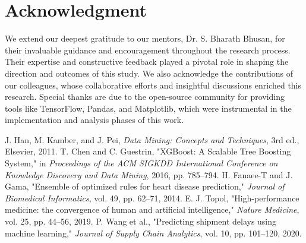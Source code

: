 \documentclass[conference]{IEEEtran}
\begin{document}
\section*{Acknowledgment}
We extend our deepest gratitude to our mentors, Dr. S. Bharath Bhusan, for their invaluable guidance and encouragement throughout the research process. Their expertise and constructive feedback played a pivotal role in shaping the direction and outcomes of this study. We also acknowledge the contributions of our colleagues, whose collaborative efforts and insightful discussions enriched this research. Special thanks are due to the open-source community for providing tools like TensorFlow, Pandas, and Matplotlib, which were instrumental in the implementation and analysis phases of this work.

\begin{thebibliography}{00}
 J. Han, M. Kamber, and J. Pei, \textit{Data Mining: Concepts and Techniques}, 3rd ed., Elsevier, 2011.
 T. Chen and C. Guestrin, "XGBoost: A Scalable Tree Boosting System," in \textit{Proceedings of the ACM SIGKDD International Conference on Knowledge Discovery and Data Mining}, 2016, pp. 785--794.
 H. Fanaee-T and J. Gama, "Ensemble of optimized rules for heart disease prediction," \textit{Journal of Biomedical Informatics}, vol. 49, pp. 62--71, 2014.
 E. J. Topol, "High-performance medicine: the convergence of human and artificial intelligence," \textit{Nature Medicine}, vol. 25, pp. 44--56, 2019.
 P. Wang et al., "Predicting shipment delays using machine learning," \textit{Journal of Supply Chain Analytics}, vol. 10, pp. 101--120, 2020.
\end{thebibliography}
\end{document}
